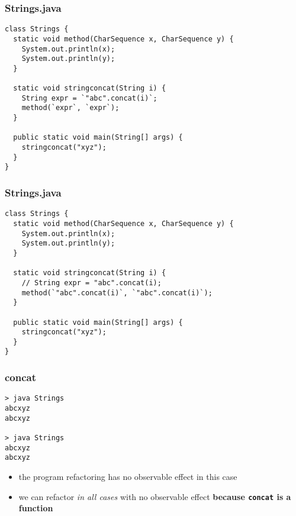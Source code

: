 \begin{frame}[fragile]
\frametitle{Strings.java}
\begin{lstlisting}[style=java]
class Strings {
  static void method(CharSequence x, CharSequence y) {
    System.out.println(x);
    System.out.println(y);
  }

  static void stringconcat(String i) {
    String expr = `"abc".concat(i)`;
    method(`expr`, `expr`);
  }

  public static void main(String[] args) {
    stringconcat("xyz");
  }
}
\end{lstlisting}
\end{frame}

\begin{frame}[fragile]
\frametitle{Strings.java}
\begin{lstlisting}[style=java]
class Strings {
  static void method(CharSequence x, CharSequence y) {
    System.out.println(x);
    System.out.println(y);
  }

  static void stringconcat(String i) {
    // String expr = "abc".concat(i);
    method(`"abc".concat(i)`, `"abc".concat(i)`);
  }

  public static void main(String[] args) {
    stringconcat("xyz");
  }
}
\end{lstlisting}
\end{frame}

\begin{frame}[fragile]
\frametitle{concat}
\begin{block}{}
\begin{lstlisting}
> java Strings
abcxyz
abcxyz

> java Strings
abcxyz
abcxyz
\end{lstlisting}
\end{block}
\begin{itemize}
  \item<1> the program refactoring has no observable effect in this case
  \item<2> we can refactor \emph{in all cases} with no observable effect \textbf{because \lstinline$concat$ is a function}
\end{itemize}
\end{frame}
